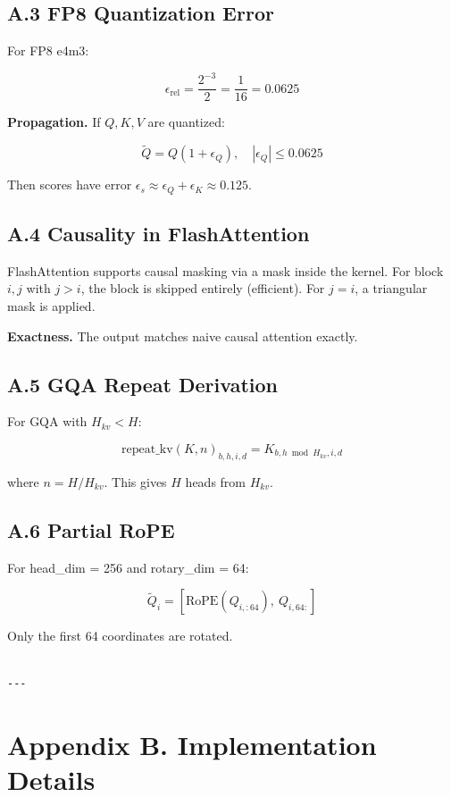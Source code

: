 \subsection{A.3 FP8 Quantization Error}

For FP8 e4m3:

\[
\epsilon_{\text{rel}} = \frac{2^{-3}}{2} = \frac{1}{16} = 0.0625
\tag{A.6}
\]

\textbf{Propagation.} If $Q, K, V$ are quantized:

\[
\tilde{Q} = Q(1 + \epsilon_Q), \quad |\epsilon_Q| \leq 0.0625
\tag{A.7}
\]

Then scores have error $\epsilon_s \approx \epsilon_Q + \epsilon_K \approx 0.125$.

\subsection{A.4 Causality in FlashAttention}

FlashAttention supports causal masking via a mask inside the kernel. For 
block $i, j$ with $j > i$, the block is skipped entirely (efficient). For 
$j = i$, a triangular mask is applied.

\textbf{Exactness.} The output matches naive causal attention exactly.

\subsection{A.5 GQA Repeat Derivation}

For GQA with $H_{kv} < H$:

\[
\text{repeat\_kv}(K, n)_{b, h, i, d} = K_{b, h \bmod H_{kv}, i, d}
\tag{A.8}
\]

where $n = H / H_{kv}$. This gives $H$ heads from $H_{kv}$.

\subsection{A.6 Partial RoPE}

For head\_dim = 256 and rotary\_dim = 64:

\[
\tilde{Q}_i = [\text{RoPE}(Q_{i, :64}), \ Q_{i, 64:}]
\tag{A.9}
\]

Only the first 64 coordinates are rotated.
\begin{lstlisting}

---
\end{lstlisting}

\section{Appendix B. Implementation Details}

